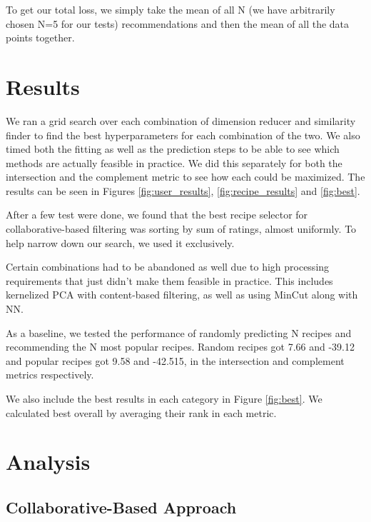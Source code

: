 \documentclass[11pt]{article}
\begin{document}
To get our total loss, we simply take the mean of all N (we have arbitrarily chosen N=5 for our tests) recommendations and then the mean of all the data points together.


\section{Results}

We ran a grid search over each combination of dimension reducer and similarity finder to find the best hyperparameters for each combination of the two. We also timed both the fitting as well as the prediction steps to be able to see which methods are actually feasible in practice. We did this separately for both the intersection and the complement metric to see how each could be maximized. The results can be seen in Figures \ref{fig:user_results}, \ref{fig:recipe_results} and \ref{fig:best}.

After a few test were done, we found that the best recipe selector for collaborative-based filtering was sorting by sum of ratings, almost uniformly. To help narrow down our search, we used it exclusively. 

Certain combinations had to be abandoned as well due to high processing requirements that just didn't make them feasible in practice. This includes kernelized PCA with content-based filtering, as well as using MinCut along with NN. 

As a baseline, we tested the performance of randomly predicting N recipes and recommending the N most popular recipes. Random recipes got 7.66 and -39.12 and popular recipes got 9.58 and -42.515, in the intersection and complement metrics respectively.


We also include the best results in each category in Figure \ref{fig:best}. We calculated best overall by averaging their rank in each metric.

\section{Analysis}

\subsection{Collaborative-Based Approach}
\end{document}
